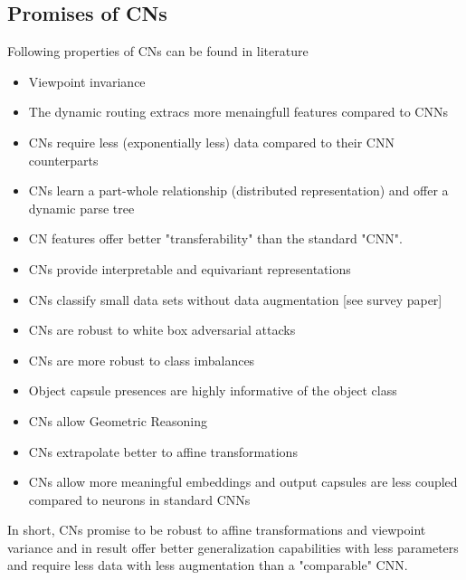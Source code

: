 \documentclass{article}
\begin{document}
\subsection{Promises of CNs}
Following properties of CNs can be found in literature
\begin{itemize}
	\item Viewpoint invariance \cite{DBLP:conf/icann/HintonKW11}
	\item The dynamic routing extracs more menaingfull features compared to CNNs \cite{DBLP:conf/nips/SabourFH17}
	\item CNs require less (exponentially less) data compared to their CNN counterparts \cite{DBLP:conf/nips/SabourFH17} \cite{DBLP:conf/miccai/Jimenez-Sanchez18}
	\item CNs learn a part-whole relationship (distributed representation) \cite{DBLP:conf/nips/SabourFH17} and offer a dynamic parse tree \cite{DBLP:journals/corr/Peer2018}
	\item CN features offer better "transferability" than the standard "CNN". \cite{DBLP:journals/corr/Ancheng2018}
	\item CNs provide interpretable and equivariant representations \cite{DBLP:conf/nips/LenssenFL18}
	\item CNs classify small data sets without data augmentation [see survey paper]
	\item CNs are robust to white box adversarial attacks \cite{DBLP:conf/iclr/HintonSF18}
	\item CNs are more robust to class imbalances \cite{DBLP:conf/miccai/Jimenez-Sanchez18}
	\item Object capsule presences are highly informative of the object class \cite{DBLP:conf/nips/KosiorekSTH19}  \cite{DBLP:journals/corr/Arjun2020}
	\item CNs allow Geometric Reasoning \cite{DBLP:conf/nips/KosiorekSTH19}
	\item CNs extrapolate better to affine transformations \cite{cvpr/GuT20}
	\item CNs allow more meaningful embeddings and output capsules are less coupled compared to neurons in standard CNNs \cite{corr/Lin2018}
\end{itemize}
In short, CNs promise to be robust to affine transformations and viewpoint variance and in result offer better generalization capabilities with less parameters and require less data with less augmentation than a "comparable" CNN.
\end{document}
